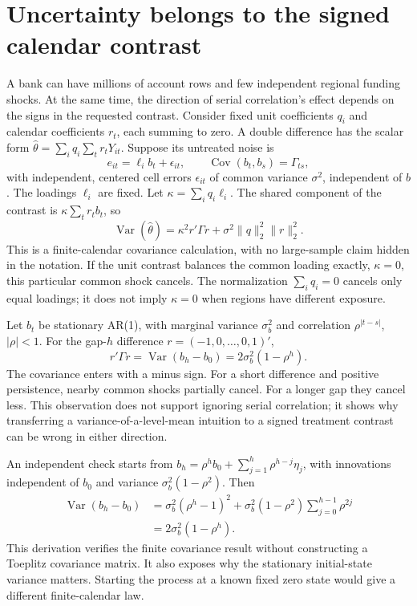 \section{Uncertainty belongs to the signed calendar contrast}
\label{exec17:s6-calendar}

A bank can have millions of account rows and few independent regional
funding shocks. At the same time, the direction of serial correlation's
effect depends on the signs in the requested contrast. Consider fixed
unit coefficients $q_i$ and calendar coefficients $r_t$, each summing
to zero. A double difference has the scalar form
$\widehat\theta=\sum_iq_i\sum_tr_tY_{it}$. Suppose its untreated
noise is
\begin{equation}
 e_{it}=\ell_i b_t+\epsilon_{it},\qquad
 \operatorname{Cov}(b_t,b_s)=\Gamma_{ts},
 \label{exec17:s6-shared-law}
\end{equation}
with independent, centered cell errors $\epsilon_{it}$ of common
variance $\sigma^2$, independent of $b$. The loadings $\ell_i$ are
fixed. Let $\kappa=\sum_iq_i\ell_i$. The shared component of the
contrast is $\kappa\sum_tr_tb_t$, so
\begin{equation}
 \operatorname{Var}(\widehat\theta)
   =\kappa^2 r'\Gamma r+\sigma^2\|q\|_2^2\|r\|_2^2.
 \label{exec17:s6-signed-variance}
\end{equation}
This is a finite-calendar covariance calculation, with no large-sample
claim hidden in the notation. If the unit contrast balances the common
loading exactly, $\kappa=0$, this particular common shock cancels.
The normalization $\sum_iq_i=0$ cancels only equal loadings; it does
not imply $\kappa=0$ when regions have different exposure.

Let $b_t$ be stationary AR(1), with marginal variance $\sigma_b^2$
and correlation $\rho^{|t-s|}$, $|\rho|<1$. For the gap-$h$
difference $r=(-1,0,\ldots,0,1)'$,
\begin{equation}
 r'\Gamma r
  =\operatorname{Var}(b_h-b_0)
  =2\sigma_b^2(1-\rho^h).
 \label{exec17:s6-gap-variance}
\end{equation}
The covariance enters with a minus sign. For a short difference and
positive persistence, nearby common shocks partially cancel. For a
longer gap they cancel less. This observation does not support ignoring
serial correlation; it shows why transferring a variance-of-a-level-mean
intuition to a signed treatment contrast can be wrong in either direction.

An independent check starts from
$b_h=\rho^hb_0+\sum_{j=1}^h\rho^{h-j}\eta_j$, with innovations
independent of $b_0$ and variance
$\sigma_b^2(1-\rho^2)$. Then
\begin{align}
 \operatorname{Var}(b_h-b_0)
 &=\sigma_b^2(\rho^h-1)^2
   +\sigma_b^2(1-\rho^2)\sum_{j=0}^{h-1}\rho^{2j}\nonumber\\
 &=2\sigma_b^2(1-\rho^h).
 \label{exec17:s6-innovation-check}
\end{align}
This derivation verifies the finite covariance result without constructing
a Toeplitz covariance matrix. It also exposes why the stationary
initial-state variance matters. Starting the process at a known fixed
zero state would give a different finite-calendar law.

